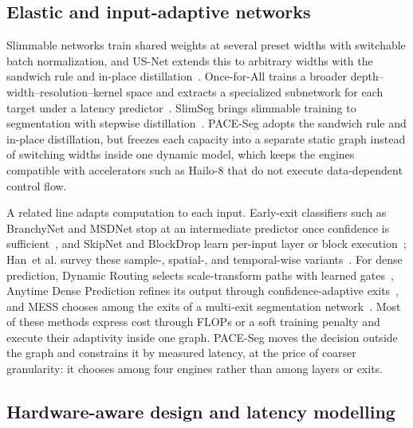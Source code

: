 \documentclass[a4paper,5p]{elsarticle}
\newcommand{\method}{PACE-Seg}
\newcommand{\etal}{et al.}
\begin{document}
\subsection{Elastic and input-adaptive networks}

Slimmable networks train shared weights at several preset widths with switchable batch normalization, and US-Net extends this to arbitrary widths with the sandwich rule and in-place distillation~\cite{yu2019slimmable,yu2019usnet}. Once-for-All trains a broader depth--width--resolution--kernel space and extracts a specialized subnetwork for each target under a latency predictor~\cite{cai2020ofa}. SlimSeg brings slimmable training to segmentation with stepwise distillation~\cite{xue2022slimseg}. \method{} adopts the sandwich rule and in-place distillation, but freezes each capacity into a separate static graph instead of switching widths inside one dynamic model, which keeps the engines compatible with accelerators such as Hailo-8 that do not execute data-dependent control flow.

A related line adapts computation to each input. Early-exit classifiers such as BranchyNet and MSDNet stop at an intermediate predictor once confidence is sufficient~\cite{teerapittayanon2016branchynet,huang2018msdnet}, and SkipNet and BlockDrop learn per-input layer or block execution~\cite{wang2018skipnet,wu2018blockdrop}; Han~\etal{} survey these sample-, spatial-, and temporal-wise variants~\cite{han2022dynamic}. For dense prediction, Dynamic Routing selects scale-transform paths with learned gates~\cite{li2020dynamic}, Anytime Dense Prediction refines its output through confidence-adaptive exits~\cite{liu2022anytime}, and MESS chooses among the exits of a multi-exit segmentation network~\cite{kouris2022mess}. Most of these methods express cost through FLOPs or a soft training penalty and execute their adaptivity inside one graph. \method{} moves the decision outside the graph and constrains it by measured latency, at the price of coarser granularity: it chooses among four engines rather than among layers or exits.

\subsection{Hardware-aware design and latency modelling}
\end{document}
